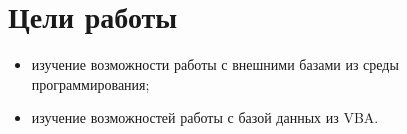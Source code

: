 \section{Цели работы}

\begin{itemize}
\item
  изучение возможности работы с внешними базами из среды программирования;
\item
  изучение возможностей работы с базой данных из VBA.
\end{itemize}



